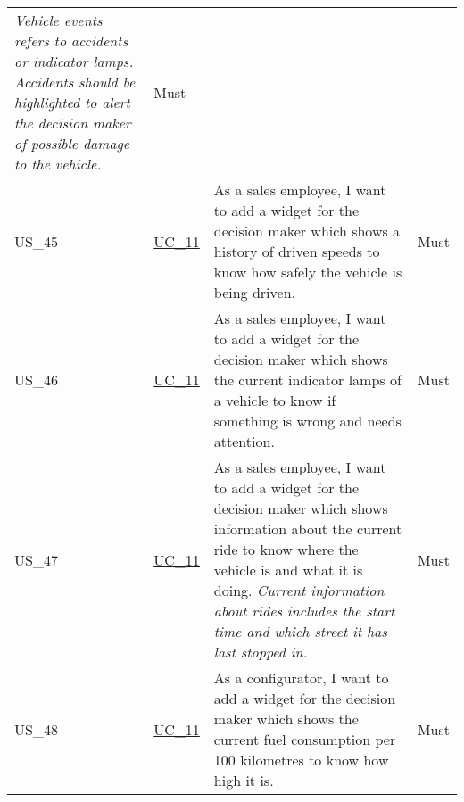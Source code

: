 \begin{footnotesize}
\begin{longtable}[L L L]{ p{} p{} p{} p{} }
      \newline
      \emph{Vehicle events refers to accidents or indicator lamps. Accidents should be highlighted to alert the decision maker of possible damage to the vehicle.} & Must
      \\
      \hypertarget{Ref:US45}{US\_45} & \hyperlink{Ref:UC11}{UC\_11} & As a sales employee, I want to add a widget for the decision maker which shows a history of driven speeds to know how safely the vehicle is being driven. & Must \\
      \hypertarget{Ref:US46}{US\_46} & \hyperlink{Ref:UC11}{UC\_11} & As a sales employee, I want to add a widget for the decision maker which shows the current indicator lamps of a vehicle to know if something is wrong and needs attention. & Must \\
      \hypertarget{Ref:US47}{US\_47} & \hyperlink{Ref:UC11}{UC\_11} & As a sales employee, I want to add a widget for the decision maker which shows information about the current ride to know where the vehicle is and what it is doing.
      \newline
      \emph{Current information about rides includes the start time and which street it has last stopped in.} & Must \\
      \hypertarget{Ref:US48}{US\_48} & \hyperlink{Ref:UC11}{UC\_11} & As a configurator, I want to add a widget for the decision maker which shows the current fuel consumption per 100 kilometres to know how high it is. & Must \\

      \bottomrule
    \end{longtable}
  \end{footnotesize}
  \rmfamily

